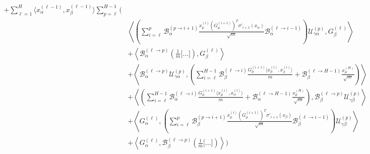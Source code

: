 \documentclass[11pt,a4paper]{article}
\theoremstyle{definition}
\begin{document}
\begin{align}
    + \sum_{\ell=1}^{H} \langle x^{(\ell-1)}_\alpha, x^{(\ell-1)}_\beta \rangle \sum_{p=\ell}^{H-1} \Biggl( & \nonumber \\
    & \left\langle \left( \sum_{i=\ell}^{p} \mathcal{B}^{(p \to i+1)}_\alpha \frac{x^{(i)}_\mu (G^{(i+1)}_\mu)^T \sigma'_{i+1}(x_\alpha)}{\sqrt{m}} \mathcal{B}^{(\ell \to i-1)}_\alpha \right) \mathcal{U}^{(p)}_{\gamma\alpha}, G^{(\ell)}_\beta \right\rangle \nonumber \\
    & + \left\langle \mathcal{B}^{(\ell \to p)}_{\alpha} \left( \frac{1}{m} \Big[ \dots \Big] \right), G^{(\ell)}_\beta \right\rangle \nonumber \\
    & + \left\langle \mathcal{B}^{(\ell \to p)}_{\alpha} \mathcal{U}^{(p)}_{\gamma\alpha}, \left( \sum_{i=\ell}^{H-1} \mathcal{B}^{(\ell \to i)}_{\beta} \frac{G^{(i+1)}_\mu \langle x^{(i)}_\mu, x^{(i)}_\beta \rangle}{m} + \mathcal{B}^{(\ell \to H-1)}_{\beta} \frac{x^{(H)}_\mu}{\sqrt{m}} \right) \right\rangle \nonumber \\
    & + \left\langle \left( \sum_{i=\ell}^{H-1} \mathcal{B}^{(\ell \to i)}_{\alpha} \frac{G^{(i+1)}_\mu \langle x^{(i)}_\mu, x^{(i)}_\alpha \rangle}{m} + \mathcal{B}^{(\ell \to H-1)}_{\alpha} \frac{x^{(H)}_\mu}{\sqrt{m}} \right), \mathcal{B}^{(\ell \to p)}_{\beta} \mathcal{U}^{(p)}_{\gamma\beta} \right\rangle \nonumber \\
    & + \left\langle G^{(\ell)}_\alpha, \left( \sum_{i=\ell}^{p} \mathcal{B}^{(p \to i+1)}_\beta \frac{x^{(i)}_\mu (G^{(i+1)}_\mu)^T \sigma'_{i+1}(x_\beta)}{\sqrt{m}} \mathcal{B}^{(\ell \to i-1)}_\beta \right) \mathcal{U}^{(p)}_{\gamma\beta} \right\rangle \nonumber \\
    & + \left\langle G^{(\ell)}_\alpha, \mathcal{B}^{(\ell \to p)}_{\beta} \left( \frac{1}{m} \Big[ \dots \Big] \right) \right\rangle \Biggr)
    \end{align}
   
\end{document}
